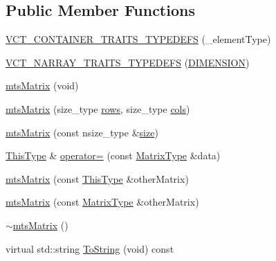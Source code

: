 \subsection*{Public Member Functions}
\begin{DoxyCompactItemize}
\item 
\hyperlink{classmts_matrix_a05a9dba88445c911845d9d506d8ecd6a}{V\-C\-T\-\_\-\-C\-O\-N\-T\-A\-I\-N\-E\-R\-\_\-\-T\-R\-A\-I\-T\-S\-\_\-\-T\-Y\-P\-E\-D\-E\-F\-S} (\-\_\-element\-Type)
\item 
\hyperlink{classmts_matrix_a14f876cfd90b0b87c5e3d2df7035061e}{V\-C\-T\-\_\-\-N\-A\-R\-R\-A\-Y\-\_\-\-T\-R\-A\-I\-T\-S\-\_\-\-T\-Y\-P\-E\-D\-E\-F\-S} (\hyperlink{classmts_matrix_a6d975d68961523d5ea32a357ca4fe73ba6aacbb86e5a9e8a2865163a7182717de}{D\-I\-M\-E\-N\-S\-I\-O\-N})
\item 
\hyperlink{classmts_matrix_ac9cad72e00bd8c2b19aea2b7559532e5}{mts\-Matrix} (void)
\item 
\hyperlink{classmts_matrix_a276c20a3bd53e9a3e0cdb9abaf6636e2}{mts\-Matrix} (size\-\_\-type \hyperlink{classvct_dynamic_const_matrix_base_a5eac13be2207ebeb8766cde379d73438}{rows}, size\-\_\-type \hyperlink{classvct_dynamic_const_matrix_base_aa6c51d41a100da49a7e7ac7edb20ecd9}{cols})
\item 
\hyperlink{classmts_matrix_a2a8541b2558c067d47018cea68dba8a3}{mts\-Matrix} (const nsize\-\_\-type \&\hyperlink{classvct_dynamic_const_matrix_base_ab9d484f83471aee6512ea614aa54bd0b}{size})
\item 
\hyperlink{classvct_dynamic_const_matrix_base_ac4ff48cbe4d9de3fdef5a02447ffb9db}{This\-Type} \& \hyperlink{classmts_matrix_a5f1bbdf2ee3d0c9be6ecc30115f3e461}{operator=} (const \hyperlink{classmts_matrix_af0f57fd565d954a7485dcb26a384d64a}{Matrix\-Type} \&data)
\item 
\hyperlink{classmts_matrix_af147e5f3289b076ba9d8ef120a4f8c08}{mts\-Matrix} (const \hyperlink{classvct_dynamic_const_matrix_base_ac4ff48cbe4d9de3fdef5a02447ffb9db}{This\-Type} \&other\-Matrix)
\item 
\hyperlink{classmts_matrix_a6db0506bfc1dffb488508c4d86afa934}{mts\-Matrix} (const \hyperlink{classmts_matrix_af0f57fd565d954a7485dcb26a384d64a}{Matrix\-Type} \&other\-Matrix)
\item 
\hyperlink{classmts_matrix_ae546daa42fa4de05f058b0920bcde8fa}{$\sim$mts\-Matrix} ()
\item 
virtual std\-::string \hyperlink{classmts_matrix_a87c946054830a85e05c76c8599759725}{To\-String} (void) const 
\item 

\end{DoxyCompactItemize}
